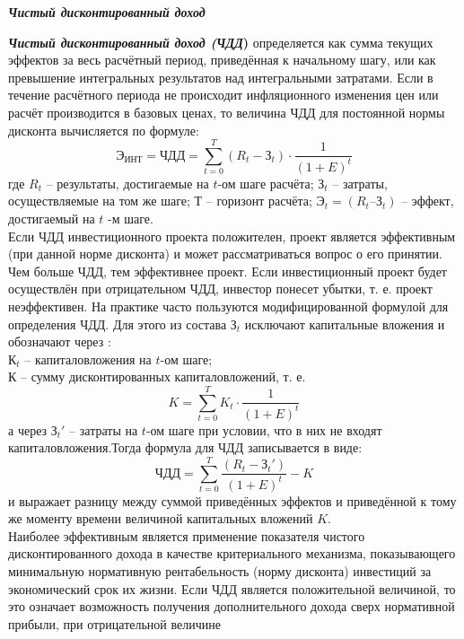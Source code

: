 \documentclass[a4paper,12pt]{article}
\begin{document}
\begin{center}
	\textbf{\textit{Чистый дисконтированный доход}}
\end{center}
\textbf{\textit{Чистый дисконтированный доход (ЧДД})} определяется как сумма
текущих эффектов за весь расчётный период, приведённая к начальному
шагу, или как превышение интегральных результатов над интегральными
затратами.
Если в течение расчётного периода не происходит инфляционного
изменения цен или расчёт производится в базовых ценах, то величина
ЧДД для постоянной нормы дисконта вычисляется по формуле:
\begin{equation}
	Э_{ИНТ} = ЧДД = \sum_{t=0}^ T (R_t - З_t)\cdot \frac{1}{(1+E)^t}
\end{equation}
где ${R_t}$ – результаты, достигаемые на ${t}$-ом шаге расчёта; ${З_t}$ – затраты, осуществляемые на том же шаге; ${Т}$ – горизонт расчёта; ${Э_t = (R_t – З_t)}$ – эффект, достигаемый на ${t}$ -м шаге.\\
Если ЧДД инвестиционного проекта положителен, проект является
эффективным (при данной норме дисконта) и может рассматриваться вопрос о его принятии. Чем больше ЧДД, тем эффективнее проект.
Если инвестиционный проект будет осуществлён при отрицательном
ЧДД, инвестор понесет убытки, т. е. проект неэффективен.
\newpage
На практике часто пользуются модифицированной формулой для
определения ЧДД. Для этого из состава ${З_t}$ исключают капитальные вложения и обозначают через :\\
${К_t}$ – капиталовложения на ${t}$-ом шаге;\\
${К}$ – сумму дисконтированных капиталовложений, т. е.
\begin{equation}
	K = \sum_{t=0}^ T K_t \cdot \frac{1}{(1+E)^t}
\end{equation}
а через ${З_t \prime}$ – затраты на ${t}$-ом шаге при условии, что в них не входят капиталовложения.Тогда формула для ЧДД записывается в виде:
\begin{equation}
	ЧДД = {\sum_{t=0}^ T \frac{(R_t - {З_t} \prime)}{(1+E)^t}} - K
\end{equation}
и выражает разницу между суммой приведённых эффектов и приведённой
к тому же моменту времени величиной капитальных вложений ${K}$.\\
Наиболее эффективным является применение показателя чистого
дисконтированного дохода в качестве критериального механизма, показывающего минимальную нормативную рентабельность (норму дисконта)
инвестиций за экономический срок их жизни. Если ЧДД является положительной величиной, то это означает возможность получения дополнительного дохода сверх нормативной прибыли, при отрицательной величине
\end{document}
